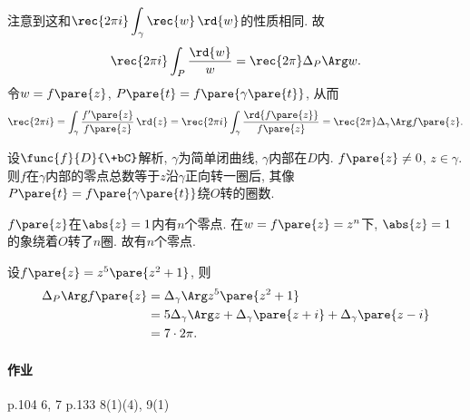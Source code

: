 \documentclass{ctexart}
\begin{document}
注意到这和$\displaystyle \rec{2\pi i} \int_\gamma \rec{w}\,\rd{w}$的性质相同. 故
\[ \rec{2\pi i}\int_P \frac{\rd{w}}{w} = \rec{2\pi}\Delta_P \Arg w. \]
令$w = f\pare{z}$, $P\pare{t} = f\pare{\gamma\pare{t}}$, 从而
\[ \rec{2\pi i} = \int_\gamma \frac{f'\pare{z}}{f\pare{z}}\,\rd{z} = \rec{2\pi i} \int_\gamma \frac{\rd{f\pare{z}}}{f\pare{z}} = \rec{2\pi}\Delta_\gamma \Arg f\pare{z}. \]
\begin{figure}[ht]
    \centering
\end{figure}
\begin{theorem}[辐角原理]
    设$\func{f}{D}{\+bC}$解析, $\gamma$为简单闭曲线, $\gamma$内部在$D$内. $f\pare{z}\neq 0$, $z\in\gamma$. 则$f$在$\gamma$内部的零点总数等于$z$沿$\gamma$正向转一圈后, 其像$P\pare{t} = f\pare{\gamma\pare{t}}$绕$O$转的圈数.
\end{theorem}
\begin{sample}
    \begin{ex}
        $f\pare{z}$在$\abs{z} = 1$内有$n$个零点. 在$w = f\pare{z} = z^n$下, $\abs{z} = 1$的象绕着$O$转了$n$圈. 故有$n$个零点.
    \end{ex}
    \begin{ex}
        设$f\pare{z} = z^5\pare{z^2+1}$, 则
        \begin{align*}
            \Delta_P \Arg f\pare{z} &= \Delta_\gamma \Arg z^5\pare{z^2+1} \\
            &= 5 \Delta_\gamma \Arg z + \Delta_\gamma \pare{z+i} + \Delta_\gamma \pare{z-i} \\
            &= 7\cdot 2\pi.
        \end{align*}
    \end{ex}
\end{sample}

\paragraph{作业} %
\label{par:作业}

p.104 6, 7 p.133 8(1)(4), 9(1)

\end{document}
